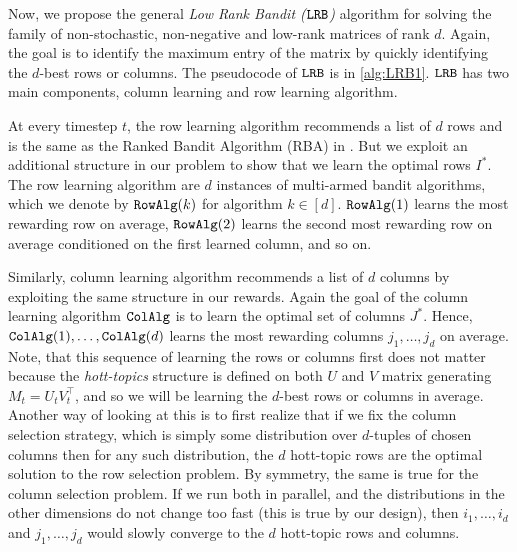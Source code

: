 
Now, we propose the general \emph{Low Rank Bandit (${\tt LRB}$)} algorithm for solving the family of non-stochastic, non-negative and low-rank matrices of rank $d$. Again, the goal is to identify the maximum entry of the matrix by quickly identifying the $d$-best rows or columns.  The pseudocode of ${\tt LRB}$ is in \cref{alg:LRB1}. ${\tt LRB}$ has two main components, column learning and row learning algorithm. 

At every timestep  $t$, the row learning algorithm recommends a list of $d$ rows and is the same as the Ranked Bandit Algorithm (RBA) in \citet{radlinski2008learning}.  But we exploit an additional structure in our problem to show that we learn the optimal rows $I^\ast$. The row learning algorithm are $d$ instances of multi-armed bandit algorithms, which we denote by ${\tt RowAlg}(k)$ for algorithm $k \in [d]$. ${\tt RowAlg}(1)$ learns the most rewarding row on average, ${\tt RowAlg}(2)$ learns the second most rewarding row on average conditioned on the first learned column, and so on.

Similarly, column learning algorithm recommends a list of $d$ columns by exploiting the same structure in our rewards. Again the goal of the column learning algorithm ${\tt ColAlg}$ is to learn the optimal set of columns $J^\ast$. Hence, ${\tt ColAlg}(1), \dots, {\tt ColAlg}(d)$ learns the most rewarding columns $j_1, \dots, j_d$  on average. Note, that this sequence of learning the rows or columns first does not matter because the \emph{hott-topics} structure is defined on both $U$ and $V$ matrix generating $M_t = U_t V_t^\intercal$, and so we will be learning the $d$-best rows or columns in average.  Another way of looking at this is to first realize that if we fix the column selection strategy, which is simply some distribution over $d$-tuples of chosen columns then for any such distribution, the $d$ hott-topic rows are the optimal solution to the row selection problem. By symmetry, the same is true for the column selection problem. If we run both in parallel, and the distributions in the other dimensions do not change too fast (this is true by our design), then $i_1, \dots, i_d$ and $j_1, \dots, j_d$ would slowly converge to the $d$ hott-topic rows and columns.


